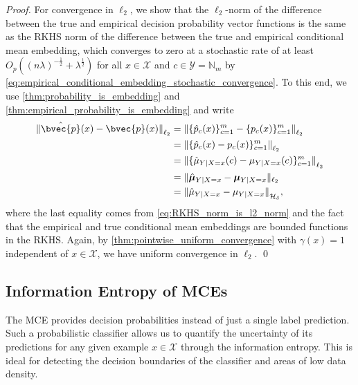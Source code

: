 \documentclass[runningheads, envcountsame, a4paper]{llncs}
\begin{document}
\begin{proof}
			For convergence in $\ell_{2}$, we show that the $\ell_{2}$-norm of the difference between the true and empirical decision probability vector functions is the same as the \gls{RKHS} norm of the difference between the true and empirical conditional mean embedding, which converges to zero at a stochastic rate of at least $O_{p}((n \lambda)^{-\frac{1}{2}} + \lambda^{\frac{1}{2}})$ for all $x \in \mathcal{X}$ and $c \in \mathcal{Y} = \mathbb{N}_{m}$ by \eqref{eq:empirical_conditional_embedding_stochastic_convergence}. To this end, we use \cref{thm:probability_is_embedding} and \cref{thm:empirical_probability_is_embedding} and write 
			\begin{equation}
			\begin{aligned}
				{\lVert \hat{\bvec{p}}(x)  - \bvec{p}(x) \rVert}_{\ell_{2}} &= {\lVert \{ \hat{p}_{c}(x) \}_{c = 1}^{m} - \{ p_{c}(x) \}_{c = 1}^{m} \rVert}_{\ell_{2}} \\
				&= {\lVert \{ \hat{p}_{c}(x) - p_{c}(x) \}_{c = 1}^{m} \rVert}_{\ell_{2}} \\
				&= {\lVert \{ \hat{\mu}_{Y | X = x}(c) - \mu_{Y | X = x}(c)\}_{c = 1}^{m} \rVert}_{\ell_{2}} \\
				&= \| \hat{\bm{\mu}}_{Y | X = x} - \bm{\mu}_{Y | X = x}  \|_{\ell_{2}} \\
				&= {\lVert \hat{\mu}_{Y | X = x} - \mu_{Y | X = x}\rVert}_{\mathcal{H}_{\delta}},
			\end{aligned}
			\end{equation}
			where the last equality comes from \eqref{eq:RKHS_norm_is_l2_norm} and the fact that the empirical and true conditional mean embeddings are bounded functions in the \gls{RKHS}. Again, by \cref{thm:pointwise_uniform_convergence} with $\gamma(x) = 1$ independent of $x \in \mathcal{X}$, we have uniform convergence in $\ell_{2}$.
			\qed
		\end{proof}
	
	
	\subsection{Information Entropy of \glspl{MCE}}
	\label{app:information_entropy}
	
		The \gls{MCE} provides decision probabilities instead of just a single label prediction. Such a probabilistic classifier allows us to quantify the uncertainty of its predictions for any given example $x \in \mathcal{X}$ through the information entropy. This is ideal for detecting the decision boundaries of the classifier and areas of low data density.
		
\end{document}
